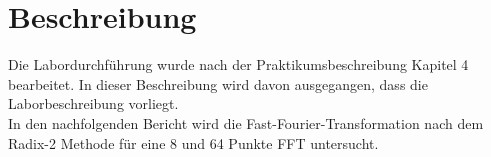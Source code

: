 \section{Beschreibung}
Die Labordurchführung wurde nach der Praktikumsbeschreibung Kapitel 4 bearbeitet. In dieser Beschreibung wird davon ausgegangen, dass die Laborbeschreibung vorliegt.\\
In den nachfolgenden Bericht wird die Fast-Fourier-Transformation nach dem Radix-2 Methode für eine 8 und 64 Punkte FFT untersucht.

